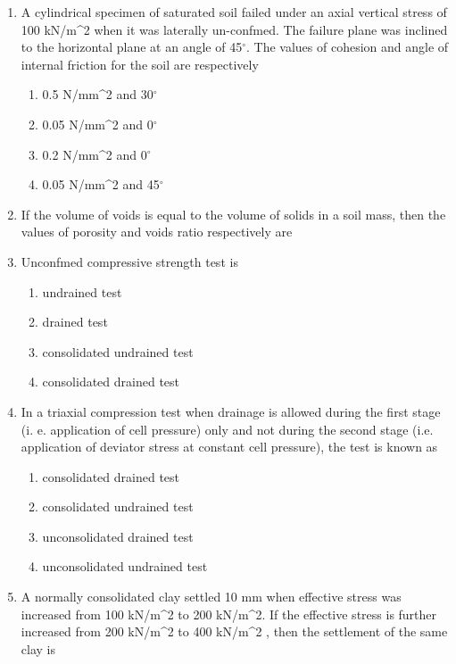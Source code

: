 \documentclass[11pt,a4paper]{article}
\begin{document}
\begin{enumerate}
\item{A cylindrical specimen of saturated soil failed under an axial vertical stress of 100 kN/m\^{}2 when it was laterally un-confmed. The failure plane was inclined to the horizontal plane at an angle of 45$^\circ$. The values of cohesion and angle of internal friction for the soil are respectively}
\begin{enumerate}[label=\Alph*.]
\item{0.5 N/mm\^{}2 and 30$^\circ$}
\item{0.05 N/mm\^{}2 and 0$^\circ$}
\item{0.2 N/mm\^{}2 and 0$^\circ$}
\item{0.05 N/mm\^{}2 and 45$^\circ$}
\end{enumerate}
\item{If the volume of voids is equal to the volume of solids in a soil mass, then the values of porosity and voids ratio respectively are}
\\
\item{Unconfmed compressive strength test is}
\begin{enumerate}[label=\Alph*.]
\item{undrained test}
\item{drained test}
\item{consolidated undrained test}
\item{consolidated drained test}
\end{enumerate}
\item{In a triaxial compression test when drainage is allowed during the first stage (i. e. application of cell pressure) only and not during the second stage (i.e. application of deviator stress at constant cell pressure), the test is known as}
\begin{enumerate}[label=\Alph*.]
\item{consolidated drained test}
\item{consolidated undrained test}
\item{unconsolidated drained test}
\item{unconsolidated undrained test}
\end{enumerate}
\item{A normally consolidated clay settled 10 mm when effective stress was increased from 100 kN/m\^{}2 to 200 kN/m\^{}2. If the effective stress is further increased from 200 kN/m\^{}2 to 400 kN/m\^{}2 , then the settlement of the same clay is}

\end{enumerate}
\end{document}
